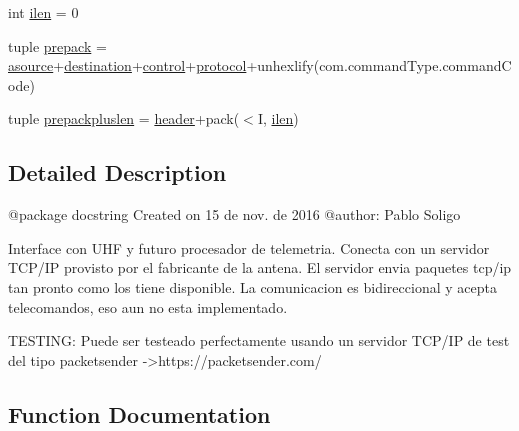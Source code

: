 \begin{DoxyCompactItemize}
\item 
int \hyperlink{namespace_tlmy_cmd_processor_1_1_tlmy_cmd_processor_a4d7892459a440d68eb1b1eaf214ccc74}{ilen} = 0
\item 
tuple \hyperlink{namespace_tlmy_cmd_processor_1_1_tlmy_cmd_processor_a081154c70ebc097a494acb04f62e01ca}{prepack} = \hyperlink{namespace_tlmy_cmd_processor_1_1_tlmy_cmd_processor_ad98365061da835e75b63669cb41debf9}{asource}+\hyperlink{namespace_tlmy_cmd_processor_1_1_tlmy_cmd_processor_ad286354f2554a3e3f558866493900c47}{destination}+\hyperlink{namespace_tlmy_cmd_processor_1_1_tlmy_cmd_processor_a716864d98c3b40bcc1b52b6f3c0f67ef}{control}+\hyperlink{namespace_tlmy_cmd_processor_1_1_tlmy_cmd_processor_a17d264f6dce0704d10c660e63fb9d6e6}{protocol}+unhexlify(com.\+command\+Type.\+command\+Code)
\item 
tuple \hyperlink{namespace_tlmy_cmd_processor_1_1_tlmy_cmd_processor_aac8bc88676dcbb49bca61e151fccf89a}{prepackpluslen} = \hyperlink{namespace_tlmy_cmd_processor_1_1_tlmy_cmd_processor_aa59c73aaa44ae3a6862aa0c8678ae47b}{header}+pack(\textquotesingle{}$<$I\textquotesingle{}, \hyperlink{namespace_tlmy_cmd_processor_1_1_tlmy_cmd_processor_a4d7892459a440d68eb1b1eaf214ccc74}{ilen})
\end{DoxyCompactItemize}


\subsection{Detailed Description}
\begin{DoxyVerb}@package docstring
Created on 15 de nov. de 2016
@author: Pablo Soligo

Interface con UHF y futuro procesador de telemetria. Conecta con un servidor TCP/IP provisto por el fabricante de la 
antena. El servidor envia paquetes tcp/ip tan pronto como los tiene disponible. La comunicacion es bidireccional y acepta 
telecomandos, eso aun no esta implementado.

TESTING: Puede ser testeado perfectamente usando un servidor TCP/IP de test del tipo packetsender 
    ->https://packetsender.com/
\end{DoxyVerb}
 

\subsection{Function Documentation}
\hypertarget{namespace_tlmy_cmd_processor_1_1_tlmy_cmd_processor_af0147d96af788791368b9d5746f8699b}{}
